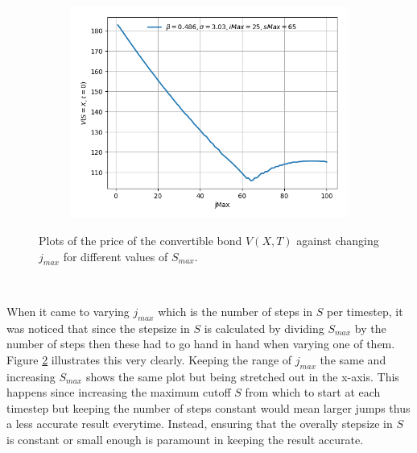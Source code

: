 \documentclass{article}
\begin{document}
\medskip
\begin{figure}[!ht]\ContinuedFloat
\centering
\begin{minipage}{.55\textwidth}
  \centering
  \begin{subfigure}{\textwidth}
      \includegraphics[width=\linewidth]{../images/smax_jmax/65_european_varying_jmax.png}
      \label{fig:varying_jmax_65}
  \end{subfigure}
\end{minipage}
\caption{Plots of the price of the convertible bond $V(X,T)$ against changing $j_{max}$ for different values of $S_{max}$.}
\label{fig:varying_jmax}
\end{figure}
\\
\par When it came to varying $j_{max}$ which is the number of steps in $S$ per timestep, it was noticed
that since the stepsize in $S$ is calculated by dividing $S_{max}$ by the number of steps then these had to go
hand in hand when varying one of them.
Figure \ref{fig:varying_jmax} illustrates this very clearly.
Keeping the range of $j_{max}$ the same and increasing $S_{max}$ shows the same plot but being stretched out in the x-axis.
This happens since increasing the maximum cutoff $S$ from which to start at each timestep but keeping the number of steps constant would mean larger jumps
thus a less accurate result everytime.
Instead, ensuring that the overally stepsize in $S$ is constant or small enough is paramount in keeping the result accurate.
\end{document}
